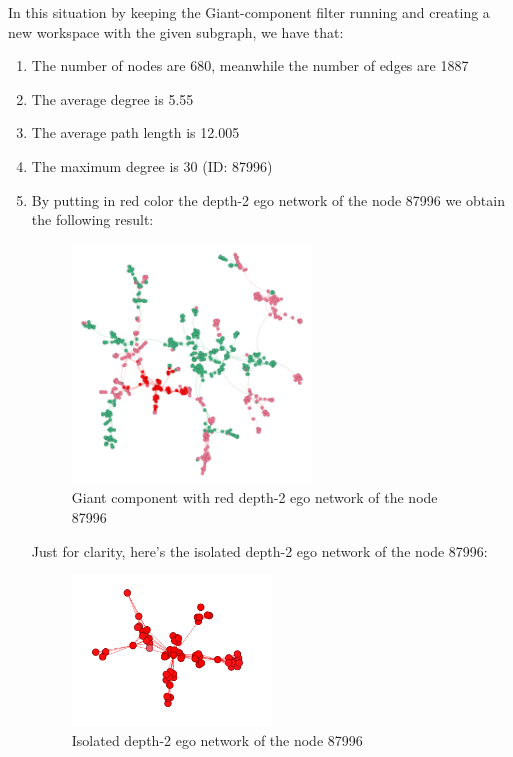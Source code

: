 \documentclass{article}
\begin{document}
    \noindent In this situation by keeping the Giant-component filter running and creating a new workspace with the given subgraph, we have that: 

    \begin{enumerate}
        \item The number of nodes are 680, meanwhile the number of edges are 1887
        \item The average degree is 5.55
        \item The average path length is 12.005
        \item The maximum degree is 30 (ID: 87996)
        \item By putting in red color the depth-2 ego network of the node 87996 we obtain the following result:
        \begin{figure}[H]
            \centering
            \includegraphics[width=0.6\textwidth]{2.0.png}
            \caption{Giant component with red depth-2 ego network of the node 87996}
            \label{fig:figure-2.0}
        \end{figure}
        \noindent Just for clarity, here's the isolated depth-2 ego network of the node 87996:
        \begin{figure}[H]
            \centering
            \includegraphics[width=0.5\textwidth]{2.1.png}
            \caption{Isolated depth-2 ego network of the node 87996}
            \label{fig:figure-2.1}
        \end{figure}
    \end{enumerate}
\end{document}
